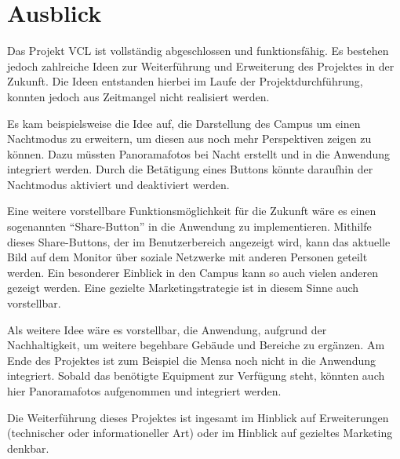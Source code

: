 \section{Ausblick}
\label{sec:Ausblick}

Das Projekt \ac{VCL} ist vollständig abgeschlossen und funktionsfähig.
Es bestehen jedoch zahlreiche Ideen zur Weiterführung und Erweiterung des 
Projektes in der Zukunft. Die Ideen entstanden hierbei im Laufe der Projektdurchführung, 
konnten jedoch aus Zeitmangel nicht realisiert werden.

Es kam beispielsweise die Idee auf, die Darstellung des Campus um einen Nachtmodus zu 
erweitern, um diesen aus noch mehr Perspektiven zeigen zu können.
Dazu müssten Panoramafotos bei Nacht erstellt und in die Anwendung integriert werden. 
Durch die Betätigung eines Buttons könnte daraufhin der Nachtmodus aktiviert und deaktiviert werden.

Eine weitere vorstellbare Funktionsmöglichkeit für die Zukunft wäre es einen 
sogenannten "`Share-Button"' in die Anwendung zu implementieren. Mithilfe dieses 
Share-Buttons, der im Benutzerbereich angezeigt wird, kann das aktuelle 
Bild auf dem Monitor über soziale Netzwerke mit anderen Personen geteilt werden.
Ein besonderer Einblick in den Campus kann so auch vielen anderen gezeigt werden.
Eine gezielte Marketingstrategie ist in diesem Sinne auch vorstellbar.

Als weitere Idee wäre es vorstellbar, die Anwendung, aufgrund der Nachhaltigkeit, um 
weitere begehbare Gebäude und Bereiche zu ergänzen. Am Ende des Projektes ist zum Beispiel
die Mensa noch nicht in die Anwendung integriert. Sobald das benötigte Equipment zur
Verfügung steht, könnten auch hier Panoramafotos aufgenommen und integriert werden.

Die Weiterführung dieses Projektes ist ingesamt im Hinblick auf
Erweiterungen (technischer oder informationeller Art) oder im Hinblick
auf gezieltes Marketing denkbar.